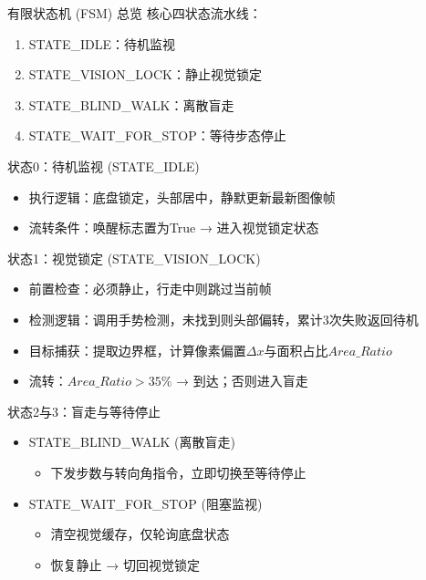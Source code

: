\documentclass{beamer}
\begin{document}
    \begin{frame}{有限状态机 (FSM) 总览}
        核心四状态流水线：
        \begin{enumerate}
            \item STATE\_IDLE：待机监视
            \item STATE\_VISION\_LOCK：静止视觉锁定
            \item STATE\_BLIND\_WALK：离散盲走
            \item STATE\_WAIT\_FOR\_STOP：等待步态停止
        \end{enumerate}
    \end{frame}

    \begin{frame}{状态0：待机监视 (STATE\_IDLE) }
        \begin{itemize}
            \item 执行逻辑：底盘锁定，头部居中，静默更新最新图像帧
            \item 流转条件：唤醒标志置为True → 进入视觉锁定状态
        \end{itemize}
    \end{frame}

    \begin{frame}{状态1：视觉锁定 (STATE\_VISION\_LOCK) }
        \begin{itemize}
            \item 前置检查：必须静止，行走中则跳过当前帧
            \item 检测逻辑：调用手势检测，未找到则头部偏转，累计3次失败返回待机
            \item 目标捕获：提取边界框，计算像素偏置$\Delta x$与面积占比$Area\_Ratio$
            \item 流转：$Area\_Ratio>35\%$ → 到达；否则进入盲走
        \end{itemize}
    \end{frame}

    \begin{frame}{状态2与3：盲走与等待停止}
        \begin{itemize}
            \item STATE\_BLIND\_WALK (离散盲走) 
            \begin{itemize}
                \item 下发步数与转向角指令，立即切换至等待停止
            \end{itemize}
            \item STATE\_WAIT\_FOR\_STOP (阻塞监视) 
            \begin{itemize}
                \item 清空视觉缓存，仅轮询底盘状态
                \item 恢复静止 → 切回视觉锁定
            \end{itemize}
        \end{itemize}
    \end{frame}
\end{document}
